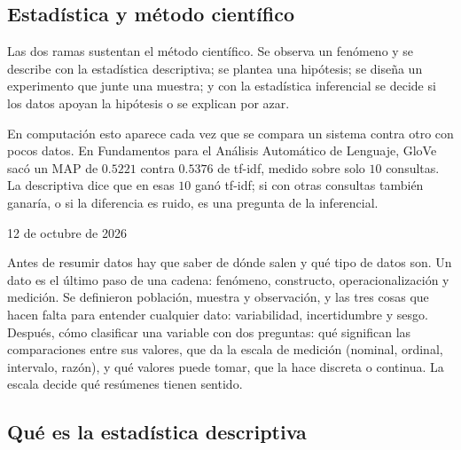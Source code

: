 \documentclass[11pt,letterpaper]{article}
\begin{document}

\subsection*{Estadística y método científico}

Las dos ramas sustentan el método científico. Se observa un fenómeno y
se describe con la estadística descriptiva; se plantea una hipótesis;
se diseña un experimento que junte una muestra; y con la estadística
inferencial se decide si los datos apoyan la hipótesis o se explican
por azar.

\begin{idea}
    En computación esto aparece cada vez que se compara un sistema
    contra otro con pocos datos. En Fundamentos para el Análisis
    Automático de Lenguaje, GloVe sacó un MAP de $0.5221$ contra
    $0.5376$ de tf-idf, medido sobre solo $10$ consultas. La
    descriptiva dice que en esas $10$ ganó tf-idf; si con otras
    consultas también ganaría, o si la diferencia es ruido, es una
    pregunta de la inferencial.
\end{idea}


\newpage


%
      {12 de octubre de 2026}

\begin{quick_sum}
    Antes de resumir datos hay que saber de dónde salen y qué tipo de
    datos son. Un dato es el último paso de una cadena: fenómeno,
    constructo, operacionalización y medición. Se definieron población,
    muestra y observación, y las tres cosas que hacen falta para
    entender cualquier dato: variabilidad, incertidumbre y sesgo.
    Después, cómo clasificar una variable con dos preguntas: qué
    significan las comparaciones entre sus valores, que da la escala de
    medición (nominal, ordinal, intervalo, razón), y qué valores puede
    tomar, que la hace discreta o continua. La escala decide qué
    resúmenes tienen sentido.
\end{quick_sum}

\subsection*{Qué es la estadística descriptiva}
\end{document}

